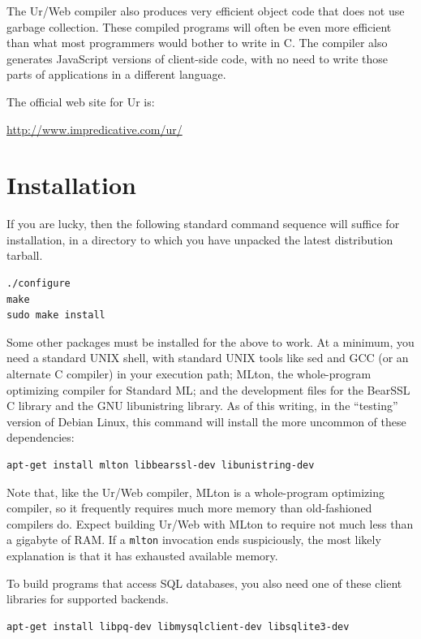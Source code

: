 \documentclass{article}
\begin{document}
The Ur/Web compiler also produces very efficient object code that does not use garbage collection.  These compiled programs will often be even more efficient than what most programmers would bother to write in C.  The compiler also generates JavaScript versions of client-side code, with no need to write those parts of applications in a different language.

\medskip

The official web site for Ur is:
\begin{center}
  \url{http://www.impredicative.com/ur/}
\end{center}


\section{Installation}

If you are lucky, then the following standard command sequence will suffice for installation, in a directory to which you have unpacked the latest distribution tarball.

\begin{verbatim}
./configure
make
sudo make install
\end{verbatim}

Some other packages must be installed for the above to work.  At a minimum, you need a standard UNIX shell, with standard UNIX tools like sed and GCC (or an alternate C compiler) in your execution path; MLton, the whole-program optimizing compiler for Standard ML; and the development files for the BearSSL C library and the GNU libunistring library.  As of this writing, in the ``testing'' version of Debian Linux, this command will install the more uncommon of these dependencies:
\begin{verbatim}
apt-get install mlton libbearssl-dev libunistring-dev
\end{verbatim}

Note that, like the Ur/Web compiler, MLton is a whole-program optimizing compiler, so it frequently requires much more memory than old-fashioned compilers do.  Expect building Ur/Web with MLton to require not much less than a gigabyte of RAM.  If a \texttt{mlton} invocation ends suspiciously, the most likely explanation is that it has exhausted available memory.

To build programs that access SQL databases, you also need one of these client libraries for supported backends.
\begin{verbatim}
apt-get install libpq-dev libmysqlclient-dev libsqlite3-dev
\end{verbatim}
\end{document}
